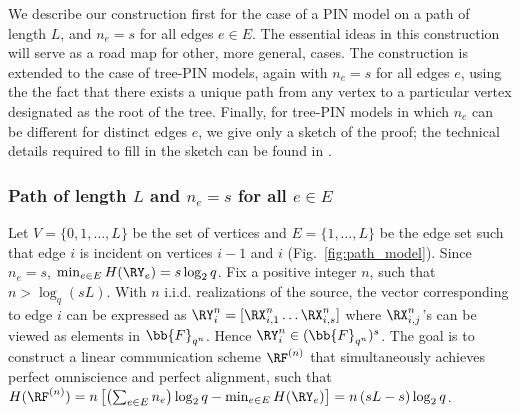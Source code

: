 We describe our construction first for the case of a PIN model on a path of length $L$, and $n_e = s$ for all edges $e \in E$. The essential ideas in this construction will serve as a road map for other, more general, cases. The construction is extended to the case of tree-PIN models, again with $n_e = s$ for all edges $e$, using the the fact that there exists a unique path from any vertex to a particular vertex designated as the root of the tree. Finally, for tree-PIN models in which $n_e$ can be different for distinct edges $e$, we give only a sketch of the proof; the technical details required to fill in the sketch can be found in \cite{treepin21arxiv}. 


\subsubsection{Path of length $L$ and $n_e=s$ for all $e \in E$}
 Let $V= \{0,1,\ldots,L\}$ be the set of vertices and $E=\{1,\ldots,L\}$ be the edge set such that edge $i$ is incident on  vertices $i-1$ and $i$ (Fig.~\ref{fig:path_model}). Since $n_e =s$, $\min_{e \in E} H(\RY_e)=s \log_2q$. Fix a positive integer $n$,  such that $n > \log_q(sL)$. With $n$ i.i.d. realizations of the source, the vector corresponding to edge $i$ can be expressed as $\RY_i^{n} =[ \RX^n_{i,1} \ldots \RX^n_{i,s}]$ where $\RX^n_{i,j}$'s  can be viewed as elements in $\bb{F}_{q^n}$. Hence $\RY_i^{n} \in (\bb{F}_{q^n})^s$.  The goal is to construct a linear communication scheme $\RF^{(n)}$ that simultaneously achieves perfect omniscience and perfect alignment, such that $H( \RF^{(n)}) =n \left[ \left(\sum_{e \in E}n_e\right) \log_2q  - \min_{e \in E} H(\RY_e)\right] = n  \left(sL - s\right) \log_2q$.
 

